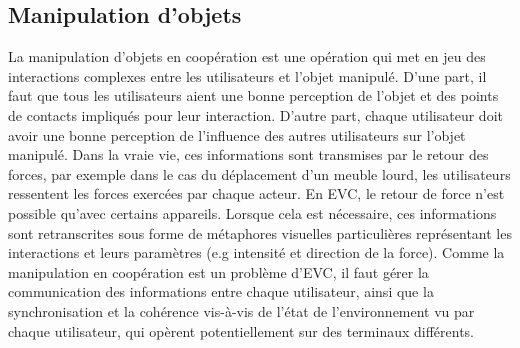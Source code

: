 \documentclass[11pt]{article}
\begin{document}
\subsection{Manipulation d'objets}
\label{subsec:manipulation}
La manipulation d'objets en coopération est une opération qui met en jeu des interactions complexes entre les utilisateurs et l'objet manipulé. D'une part, il faut que tous les utilisateurs aient une bonne perception de l'objet et des points de contacts impliqués pour leur interaction. D'autre part, chaque utilisateur doit avoir une bonne perception de l'influence des autres utilisateurs sur l'objet manipulé. Dans la vraie vie, ces informations sont transmises par le retour des forces, par exemple dans le cas du déplacement d'un meuble lourd, les utilisateurs ressentent les forces exercées par chaque acteur. En EVC, le retour de force n'est possible qu'avec certains appareils. Lorsque cela est nécessaire, ces informations sont retranscrites sous forme de métaphores visuelles particulières représentant les interactions et leurs paramètres (e.g intensité et direction de la force). Comme la manipulation en coopération est un problème d'EVC, il faut gérer la communication des informations entre chaque utilisateur, ainsi que la synchronisation et la cohérence vis-à-vis de l'état de l'environnement vu par chaque utilisateur, qui opèrent potentiellement sur des terminaux différents.
\end{document}
